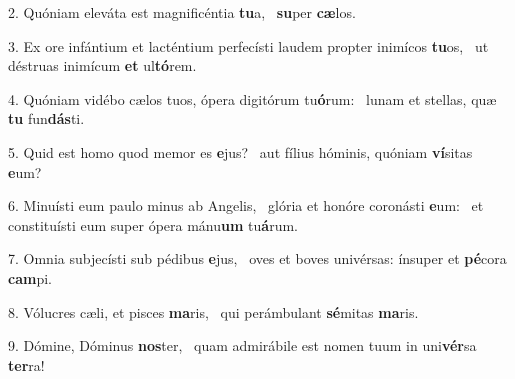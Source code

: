 2. Quóniam eleváta est magnificéntia \textbf{tu}a, \ast\  \textbf{su}per \textbf{cæ}los.\

3. Ex ore infántium et lacténtium perfecísti laudem propter inimícos \textbf{tu}os, \ast\  ut déstruas inimícum \textbf{et} ul\textbf{tó}rem.\

4. Quóniam vidébo cælos tuos, ópera digitórum tu\textbf{ó}rum: \ast\  lunam et stellas, quæ \textbf{tu} fun\textbf{dás}ti.\

5. Quid est homo quod memor es \textbf{e}jus? \ast\  aut fílius hóminis, quóniam \textbf{ví}sitas \textbf{e}um?\

6. Minuísti eum paulo minus ab Angelis, \dag\  glória et honóre coronásti \textbf{e}um: \ast\  et constituísti eum super ópera mánu\textbf{um} tu\textbf{á}rum.\

7. Omnia subjecísti sub pédibus \textbf{e}jus, \ast\  oves et boves univérsas: ínsuper et \textbf{pé}cora \textbf{cam}pi.\

8. Vólucres cæli, et pisces \textbf{ma}ris, \ast\  qui perámbulant \textbf{sé}mitas \textbf{ma}ris.\

9. Dómine, Dóminus \textbf{nos}ter, \ast\  quam admirábile est nomen tuum in uni\textbf{vér}sa \textbf{ter}ra!\

